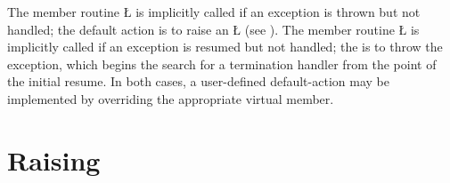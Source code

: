 \documentclass[openright,twoside]{report}
\begin{document}
The member routine \LGinlinetrue\LGbegin\lgrinde\L{}\endlgrinde\LGend{} is implicitly called if an exception is thrown but not handled;
the default action is to raise an \LGinlinetrue\LGbegin\lgrinde\L{}\endlgrinde\LGend{} (see ).
The member routine \LGinlinetrue\LGbegin\lgrinde\L{}\endlgrinde\LGend{} is implicitly called if an exception is resumed but not handled;
the  is to throw the exception, which begins the search for a termination handler from the point of the initial resume.
In both cases, a user-defined default-action may be implemented by overriding the appropriate virtual member.


\section{Raising}
\label{s:Raising}
\end{document}
